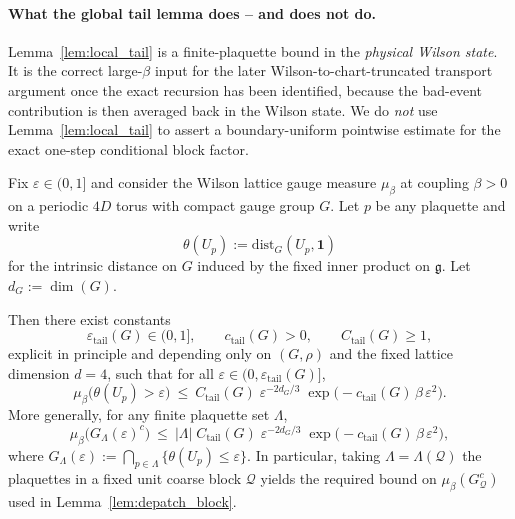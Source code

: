 \paragraph{What the global tail lemma does -- and does not do.}
Lemma~\ref{lem:local_tail} is a finite-plaquette bound in the \emph{physical Wilson state}.
It is the correct large-$\beta$ input for the later Wilson-to-chart-truncated transport argument once the exact recursion has been identified, because the bad-event contribution is then averaged back in the Wilson state.
We do \emph{not} use Lemma~\ref{lem:local_tail} to assert a boundary-uniform pointwise estimate for the exact one-step conditional block factor.

\begin{lemma}\label{lem:local_tail}
Fix $\varepsilon\in(0,1]$ and consider the Wilson lattice gauge measure $\mu_\beta$ at coupling $\beta>0$ on a periodic $4D$ torus with compact gauge group $G$.
Let $p$ be any plaquette and write
\[
\theta(U_p):=\mathrm{dist}_{G}(U_p,\mathbf 1)
\]
for the intrinsic distance on $G$ induced by the fixed inner product on $\mathfrak g$.
Let $d_G:=\dim(G)$.

Then there exist constants
\[
\varepsilon_{\mathrm{tail}}(G)\in(0,1],\qquad c_{\mathrm{tail}}(G)>0,\qquad C_{\mathrm{tail}}(G)\ge 1,
\]
explicit in principle and depending only on $(G,\rho)$ and the fixed lattice dimension $d=4$, such that for all $\varepsilon\in(0,\varepsilon_{\mathrm{tail}}(G)]$,
\begin{equation}\label{eq:one_plaq_tail}
\mu_\beta\big(\theta(U_p)>\varepsilon\big)\ \le\ C_{\mathrm{tail}}(G)\;\varepsilon^{-2d_G/3}\;
\exp\!\Big(-c_{\mathrm{tail}}(G)\,\beta\,\varepsilon^2\Big).
\end{equation}
More generally, for any finite plaquette set $\Lambda$,
\begin{equation}\label{eq:finite_set_tail}
\mu_\beta\big(G_{\Lambda}(\varepsilon)^c\big)\ \le\ |\Lambda|\;C_{\mathrm{tail}}(G)\;\varepsilon^{-2d_G/3}\;
\exp\!\Big(-c_{\mathrm{tail}}(G)\,\beta\,\varepsilon^2\Big),
\end{equation}
where $G_{\Lambda}(\varepsilon):=\bigcap_{p\in\Lambda}\{\theta(U_p)\le \varepsilon\}$.
In particular, taking $\Lambda=\Lambda(\mathcal Q)$ the plaquettes in a fixed unit coarse block $\mathcal Q$ yields the required bound on
$\mu_\beta(G_{\mathcal Q}^c)$ used in Lemma~\ref{lem:depatch_block}.
\end{lemma}

